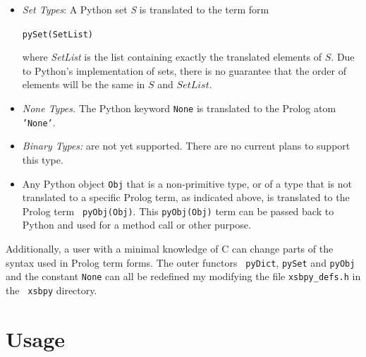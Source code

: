 \begin{itemize}
         {\tt ''(Key,Value)}

         {\tt Key} and {\tt Value} are the translations of any Python
         data structures that are both allowable as a dictionary key
         or value, and supported by {\tt xsbpy}.  For instance, {\tt
           Value} can be (the term form of) a list, a set, a tuple or
         another dictionary.

       \item {\em Set Types}: A Python set {\em S} is translated to
         the term form

         {\tt pySet(SetList)}

         where {\em SetList} is the list containing exactly the
         translated elements of $S$.  Due to Python's implementation
         of sets, there is no guarantee that the order of elements
         will be the same in $S$ and $SetList$.
       \item {\em None Types.} The Python keyword {\tt None} is
         translated to the Prolog atom {\tt 'None'}. 
       \item {\em Binary Types:} are not yet supported.  There are no
         current plans to support this type.
     \item Any Python object {\tt Obj} that is a non-primitive type,
       or of a type that is not translated to a specific Prolog term,
       as indicated above, is translated to the Prolog term {\tt
         pyObj(Obj)}.  This {\tt pyObj(Obj)} term can be passed back to
       Python and used for a method call or other purpose.
\end{itemize}

Additionally, a user with a minimal knowledge of C can change parts of
the syntax used in Prolog term forms.  The outer functors {\tt
  pyDict}, {\tt pySet} and {\tt pyObj} and the constant {\tt None} can
all be redefined my modifying the file {\tt xsbpy\_defs.h} in the {\tt
  xsbpy} directory.

\section{Usage}

